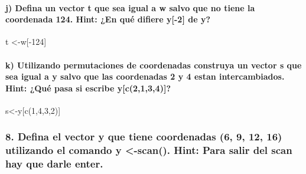\documentclass[
]{article}
\newenvironment{Shaded}{\begin{snugshade}}{\end{snugshade}}
\newcommand{\DecValTok}[1]{\textcolor[rgb]{0.00,0.00,0.81}{#1}}
\newcommand{\FunctionTok}[1]{\textcolor[rgb]{0.00,0.00,0.00}{#1}}
\newcommand{\NormalTok}[1]{#1}
\newcommand{\OtherTok}[1]{\textcolor[rgb]{0.56,0.35,0.01}{#1}}
\newcommand{\SpecialCharTok}[1]{\textcolor[rgb]{0.00,0.00,0.00}{#1}}
\begin{document}
\hypertarget{j-defina-un-vector-t-que-sea-igual-a-w-salvo-que-no-tiene-la-coordenada-124.-hint-en-quuxe9-difiere-y-2-de-y}{%
\paragraph{j) Defina un vector t que sea igual a w salvo que no tiene la
coordenada 124. Hint: ¿En qué difiere y{[}-2{]} de
y?}\label{j-defina-un-vector-t-que-sea-igual-a-w-salvo-que-no-tiene-la-coordenada-124.-hint-en-quuxe9-difiere-y-2-de-y}}

\begin{Shaded}
\begin{Highlighting}[]
\NormalTok{t }\OtherTok{\textless{}{-}}\NormalTok{w[}\SpecialCharTok{{-}}\DecValTok{124}\NormalTok{]}
\end{Highlighting}
\end{Shaded}

\hypertarget{k-utilizando-permutaciones-de-coordenadas-construya-un-vector-s-que-sea-igual-a-y-salvo-que-las-coordenadas-2-y-4-estan-intercambiados.-hint-quuxe9-pasa-si-escribe-yc2134}{%
\paragraph{k) Utilizando permutaciones de coordenadas construya un
vector s que sea igual a y salvo que las coordenadas 2 y 4 estan
intercambiados. Hint: ¿Qué pasa si escribe
y{[}c(2,1,3,4){]}?}\label{k-utilizando-permutaciones-de-coordenadas-construya-un-vector-s-que-sea-igual-a-y-salvo-que-las-coordenadas-2-y-4-estan-intercambiados.-hint-quuxe9-pasa-si-escribe-yc2134}}

\begin{Shaded}
\begin{Highlighting}[]
\NormalTok{s}\OtherTok{\textless{}{-}}\NormalTok{y[}\FunctionTok{c}\NormalTok{(}\DecValTok{1}\NormalTok{,}\DecValTok{4}\NormalTok{,}\DecValTok{3}\NormalTok{,}\DecValTok{2}\NormalTok{)]}
\end{Highlighting}
\end{Shaded}

\hypertarget{defina-el-vector-y-que-tiene-coordenadas-6-9-12-16-utilizando-el-comando-y--scan.-hint-para-salir-del-scan-hay-que-darle-enter.}{%
\subsubsection{8. Defina el vector y que tiene coordenadas (6, 9, 12,
16) utilizando el comando y \textless-scan(). Hint: Para salir del scan
hay que darle
enter.}\label{defina-el-vector-y-que-tiene-coordenadas-6-9-12-16-utilizando-el-comando-y--scan.-hint-para-salir-del-scan-hay-que-darle-enter.}}
\end{document}
